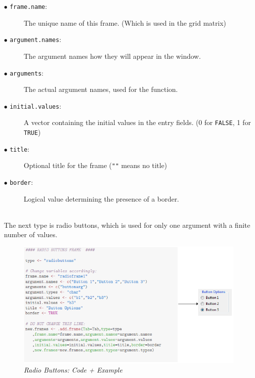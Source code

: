 \documentclass[a4paper]{article}\usepackage[]{graphicx}\usepackage[]{color}
\begin{document}
\begin{description}
  \item[$\bullet$ \texttt{frame.name}:] The unique name of this frame. (Which is used in the grid matrix)
  \item[$\bullet$ \texttt{argument.names}:] The argument names how they will
  appear in the window.
  \item[$\bullet$ \texttt{arguments}:] The actual argument names, used for the
  function.
  \item[$\bullet$ \texttt{initial.values}:] A vector containing the initial
  values in the entry fields. (0 for \verb|FALSE|, 1 for \verb|TRUE|)
  \item[$\bullet$ \texttt{title}:] Optional title for the frame (\verb|""| means no title)
  \item[$\bullet$ \texttt{border}:] Logical value determining the presence of a
  border. 
\end{description}


\\
The next type is radio buttons, which is used for only one argument with a
finite number of values.
\begin{figure}[H]
\centering
\includegraphics[scale=0.5]{figures/radiobuttons.png}
\caption{{\it Radio Buttons: Code + Example}
\label{radiobuttons}}
\end{figure}
\end{document}
